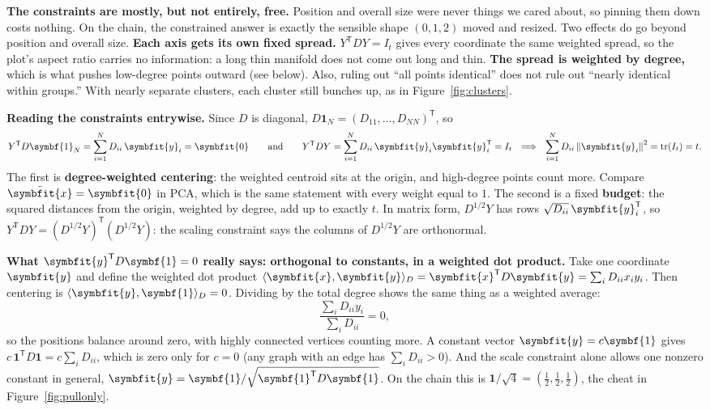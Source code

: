 \documentclass[11pt]{article}
\newcommand{\bm}[1]{\symbfit{#1}}
\newcommand{\one}{\symbf{1}}
\newcommand{\xbar}{\bar{\bm{x}}}
\newcommand{\T}{^{\mathsf T}}
\newcommand{\tr}{\operatorname{tr}}
\newcommand{\norm}[1]{\left\lVert #1\right\rVert}
\begin{document}
\begin{careful}
\textbf{The constraints are mostly, but not entirely, free.} Position and overall size were never things we cared about, so pinning them down costs nothing. On the chain, the constrained answer is exactly the sensible shape $(0,1,2)$ moved and resized. Two effects do go beyond position and overall size.
\textbf{Each axis gets its own fixed spread.} $Y\T DY=I_t$ gives every coordinate the same weighted spread, so the plot's aspect ratio carries no information: a long thin manifold does not come out long and thin.
\textbf{The spread is weighted by degree,} which is what pushes low-degree points outward (see below).
Also, ruling out ``all points identical'' does not rule out ``nearly identical within groups.'' With nearly separate clusters, each cluster still bunches up, as in Figure~\ref{fig:clusters}.
\end{careful}

\textbf{Reading the constraints entrywise.} Since $D$ is diagonal, $D\one_N=(D_{11},\dots,D_{NN})\T$, so
\[
Y\T D\one_N=\sum_{i=1}^ND_{ii}\,\bm y_i=\bm0
\qquad\text{and}\qquad
Y\T DY=\sum_{i=1}^ND_{ii}\,\bm y_i\bm y_i\T=I_t\ \ \Longrightarrow\ \ \sum_{i=1}^ND_{ii}\norm{\bm y_i}^2=\tr(I_t)=t .
\]
The first is \textbf{degree-weighted centering}: the weighted centroid sits at the origin, and high-degree points count more. Compare
$\xbar=\bm 0$ in PCA, which is the same statement with every weight equal to $1$. The second is a fixed \textbf{budget}: the squared
distances from the origin, weighted by degree, add up to exactly $t$. In matrix form, $D^{1/2}Y$ has rows $\sqrt{D_{ii}}\,\bm y_i\T$, so
$Y\T DY=(D^{1/2}Y)\T(D^{1/2}Y)$: the scaling constraint says the columns of $D^{1/2}Y$ are orthonormal.

\textbf{What $\bm y\T D\one=0$ really says: orthogonal to constants, in a weighted dot product.} Take one coordinate $\bm y$ and define the weighted dot product $\langle\bm x,\bm y\rangle_D=\bm x\T D\bm y=\sum_iD_{ii}x_iy_i$. Then centering is $\langle\bm y,\one\rangle_D=0$. Dividing by the total degree shows the same thing as a weighted average:
\[
\frac{\sum_iD_{ii}y_i}{\sum_iD_{ii}}=0 ,
\]
so the positions balance around zero, with highly connected vertices counting more. A constant vector $\bm y=c\one$ gives $c\,\one\T D\one=c\sum_iD_{ii}$, which is zero only for $c=0$ (any graph with an edge has $\sum_iD_{ii}>0$). And the scale constraint alone allows one nonzero constant in general, $\bm y=\one/\sqrt{\one\T D\one}$. On the chain this is $\one/\sqrt4=(\tfrac12,\tfrac12,\tfrac12)$, the cheat in Figure~\ref{fig:pullonly}.
\end{document}
